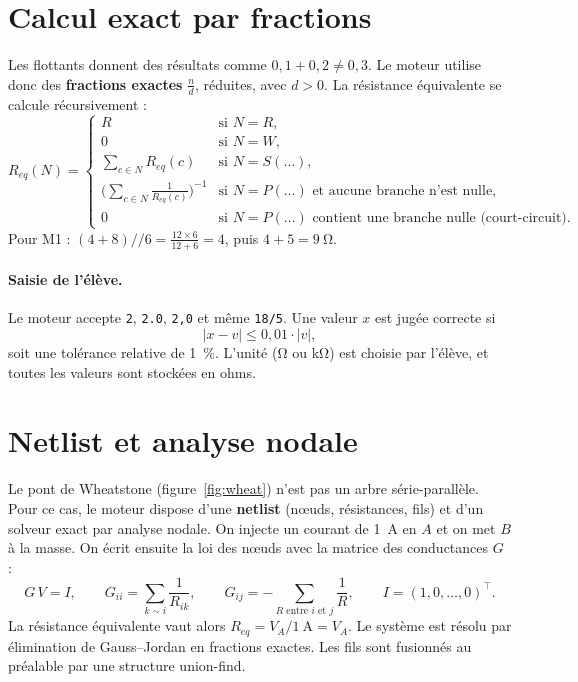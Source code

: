 \documentclass[11pt,a4paper]{report}
\newcommand{\req}{R_{eq}}
\newcommand{\para}{\mathbin{/\!/}}
\newcommand{\code}[1]{\texttt{#1}}
\begin{document}
\section{Calcul exact par fractions}
Les flottants donnent des résultats comme $0{,}1 + 0{,}2 \neq 0{,}3$. Le moteur utilise donc des \textbf{fractions exactes} $\frac{n}{d}$, réduites, avec $d > 0$. La résistance équivalente se calcule récursivement :
\begin{equation}
  \req(N) =
  \begin{cases}
    R & \text{si } N = R,\\
    0 & \text{si } N = W,\\
    \displaystyle\sum_{c \in N} \req(c) & \text{si } N = S(\dots),\\[3mm]
    \displaystyle\Big(\sum_{c \in N} \frac{1}{\req(c)}\Big)^{-1} & \text{si } N = P(\dots) \text{ et aucune branche n'est nulle},\\[3mm]
    0 & \text{si } N = P(\dots) \text{ contient une branche nulle (court-circuit).}
  \end{cases}
\end{equation}
Pour M1 : $(4+8) \para 6 = \frac{12 \times 6}{12+6} = 4$, puis $4 + 5 = \SI{9}{\ohm}$.

\paragraph{Saisie de l'élève.} Le moteur accepte \code{2}, \code{2.0}, \code{2,0} et même \code{18/5}. Une valeur $x$ est jugée correcte si
\begin{equation}
  |x - v| \le 0{,}01 \cdot |v|,
\end{equation}
soit une tolérance relative de \SI{1}{\percent}. L'unité (\si{\ohm} ou \si{\kilo\ohm}) est choisie par l'élève, et toutes les valeurs sont stockées en ohms.

\section{Netlist et analyse nodale}\label{sec:netlist}
Le pont de Wheatstone (figure~\ref{fig:wheat}) n'est pas un arbre série-parallèle. Pour ce cas, le moteur dispose d'une \textbf{netlist} (nœuds, résistances, fils) et d'un solveur exact par analyse nodale. On injecte un courant de \SI{1}{\ampere} en $A$ et on met $B$ à la masse. On écrit ensuite la loi des nœuds avec la matrice des conductances $G$ :
\begin{equation}
  G\,V = I,
  \qquad
  G_{ii} = \sum_{k \sim i} \frac{1}{R_{ik}},
  \qquad
  G_{ij} = -\sum_{\text{$R$ entre $i$ et $j$}} \frac{1}{R},
  \qquad
  I = (1, 0, \dots, 0)^{\top}.
\end{equation}
La résistance équivalente vaut alors $\req = V_A / \SI{1}{\ampere} = V_A$. Le système est résolu par élimination de Gauss--Jordan en fractions exactes. Les fils sont fusionnés au préalable par une structure union-find.
\end{document}
